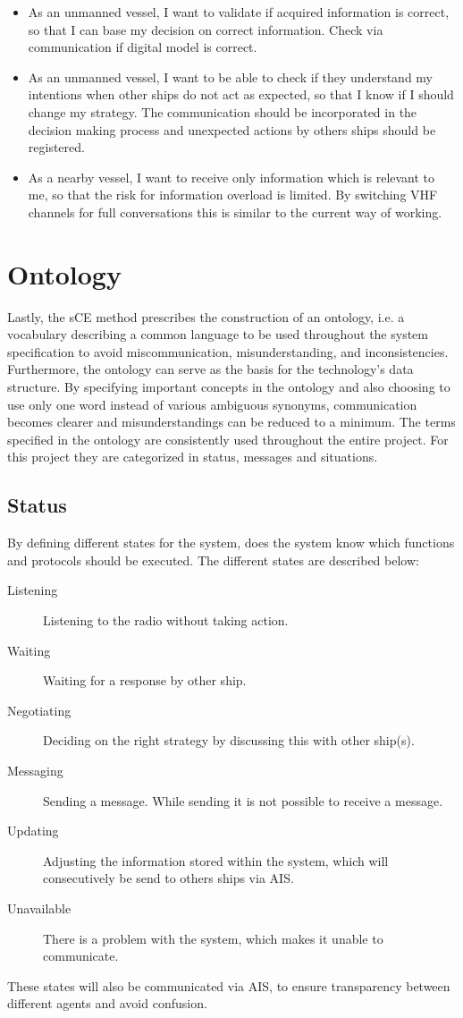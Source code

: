 \begin{itemize}
	\item As an unmanned vessel, I want to validate if acquired information is correct, so that I can base my decision on correct information. Check via communication if digital model is correct.
	
	\item As an unmanned vessel, I want to be able to check if they understand my intentions when other ships do not act as expected, so that I know if I should change my strategy. The communication should be incorporated in the decision making process and unexpected actions by others ships should be registered.
	
	\item As a nearby vessel, I want to receive only information which is relevant to me, so that the risk for information overload is limited. By switching \ac{VHF} channels for full conversations this is similar to the current way of working.
\end{itemize}

\section{Ontology}
Lastly, the sCE method prescribes the construction of an ontology, i.e. a vocabulary describing a common language to be used throughout the system specification to avoid miscommunication, misunderstanding, and inconsistencies. Furthermore, the ontology can serve as the basis for the technology’s data structure. By specifying important concepts in the ontology and also choosing to use only one word instead of various ambiguous synonyms, communication becomes clearer and misunderstandings can be reduced to a minimum. The terms specified in the ontology are consistently used throughout the entire project. For this project they are categorized in status, messages and situations.

\subsection{Status}
By defining different states for the system, does the system know which functions and protocols should be executed. The different states are described below:
\begin{description}
	\item [Listening] Listening to the radio without taking action.
	\item [Waiting] Waiting for a response by other ship.
	\item [Negotiating] Deciding on the right strategy by discussing this with other ship(s).
	\item [Messaging] Sending a message. While sending it is not possible to receive a message.
	\item [Updating] Adjusting the information stored within the system, which will consecutively be send to others ships via \ac{AIS}.
	\item [Unavailable] There is a problem with the system, which makes it unable to communicate.
\end{description}
These states will also be communicated via \ac{AIS}, to ensure transparency between different agents and avoid confusion.


